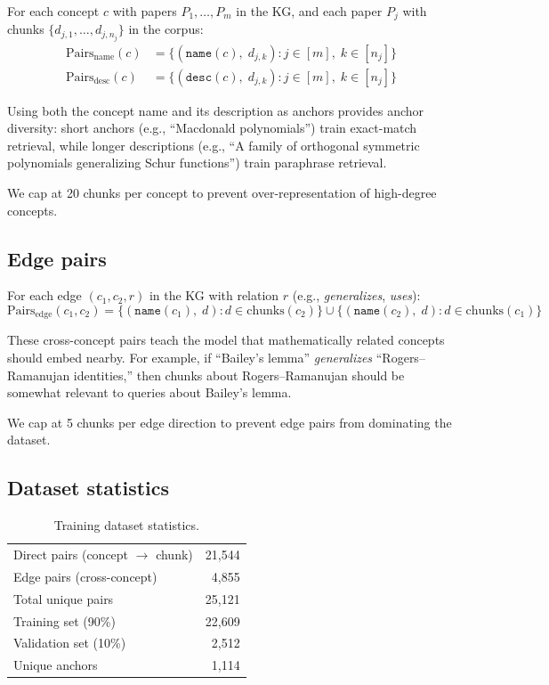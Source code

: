 \documentclass[11pt,a4paper]{article}
\begin{document}
For each concept $c$ with papers $P_1, \ldots, P_m$ in the KG, and each
paper $P_j$ with chunks $\{d_{j,1}, \ldots, d_{j,n_j}\}$ in the corpus:
\begin{align}
    \text{Pairs}_{\text{name}}(c) &= \{(\texttt{name}(c),\; d_{j,k}) :
        j \in [m],\; k \in [n_j]\} \\
    \text{Pairs}_{\text{desc}}(c) &= \{(\texttt{desc}(c),\; d_{j,k}) :
        j \in [m],\; k \in [n_j]\}
\end{align}

Using both the concept name and its description as anchors provides anchor
diversity: short anchors (e.g., ``Macdonald polynomials'') train exact-match
retrieval, while longer descriptions (e.g., ``A family of orthogonal
symmetric polynomials generalizing Schur functions'') train paraphrase
retrieval.

We cap at 20 chunks per concept to prevent over-representation of
high-degree concepts.

\subsection{Edge pairs}

For each edge $(c_1, c_2, r)$ in the KG with relation $r$ (e.g.,
\emph{generalizes}, \emph{uses}):
\begin{equation}
    \text{Pairs}_{\text{edge}}(c_1, c_2) = \{(\texttt{name}(c_1),\; d) :
        d \in \text{chunks}(c_2)\} \cup \{(\texttt{name}(c_2),\; d) :
        d \in \text{chunks}(c_1)\}
\end{equation}

These cross-concept pairs teach the model that mathematically related concepts
should embed nearby. For example, if ``Bailey's lemma'' \emph{generalizes}
``Rogers--Ramanujan identities,'' then chunks about Rogers--Ramanujan should
be somewhat relevant to queries about Bailey's lemma.

We cap at 5 chunks per edge direction to prevent edge pairs from dominating
the dataset.

\subsection{Dataset statistics}

\begin{table}[h]
\centering
\caption{Training dataset statistics.}
\label{tab:dataset}
\begin{tabular}{lr}
\toprule
Direct pairs (concept $\to$ chunk) & 21,544 \\
Edge pairs (cross-concept) & 4,855 \\
Total unique pairs & 25,121 \\
Training set (90\%) & 22,609 \\
Validation set (10\%) & 2,512 \\
Unique anchors & 1,114 \\
\bottomrule
\end{tabular}
\end{table}
\end{document}
